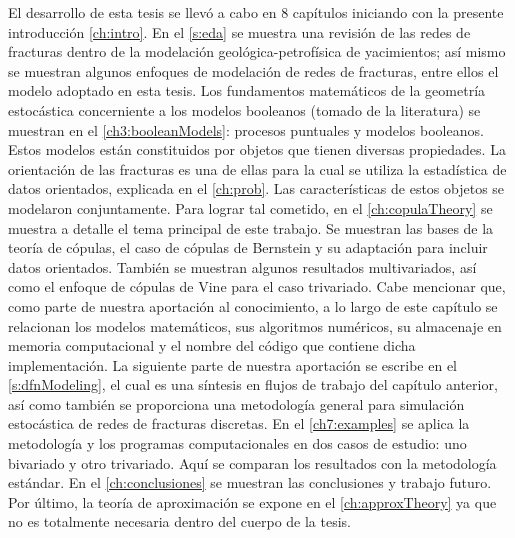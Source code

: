 El desarrollo de esta tesis se llev\'o a cabo en 8 cap\'itulos iniciando con la presente introducci\'on \autoref{ch:intro}.
En el \autoref{s:eda} se muestra una revisi\'on de las redes de fracturas dentro de la modelaci\'on geol\'ogica-petrof\'isica de yacimientos; as\'i mismo se muestran algunos enfoques de modelaci\'on de redes de fracturas, entre ellos el modelo adoptado en esta tesis.
Los fundamentos matem\'aticos de la geometr\'ia estoc\'astica concerniente a los modelos booleanos (tomado de la literatura) se muestran en el \autoref{ch3:booleanModels}: procesos puntuales y modelos booleanos.
Estos modelos est\'an constituidos por objetos que tienen diversas propiedades.
La orientaci\'on de las fracturas es una de ellas para la cual se utiliza la estad\'istica de datos orientados, explicada en el \autoref{ch:prob}. 
Las caracter\'isticas de estos objetos se modelaron conjuntamente.
Para lograr tal cometido, en el \autoref{ch:copulaTheory} se muestra a detalle el tema principal de este trabajo. Se muestran las bases de la teor\'ia de c\'opulas, el caso de c\'opulas de Bernstein y su adaptaci\'on para incluir datos orientados.
Tambi\'en se muestran algunos resultados multivariados, as\'i como el enfoque de c\'opulas de Vine para el caso trivariado.
Cabe mencionar que, como parte de nuestra aportaci\'on al conocimiento, a lo largo de este cap\'itulo se relacionan los modelos matem\'aticos, sus algoritmos num\'ericos, su almacenaje en memoria computacional y el nombre del c\'odigo que contiene dicha implementaci\'on.
La siguiente parte de nuestra aportaci\'on se escribe en el \autoref{s:dfnModeling}, el cual es una s\'intesis en flujos de trabajo del cap\'itulo anterior, as\'i como tambi\'en se proporciona una metodolog\'ia general para simulaci\'on estoc\'astica de redes de fracturas discretas.
En el \autoref{ch7:examples} se aplica la metodolog\'ia y los programas computacionales en dos casos de estudio: uno bivariado y otro trivariado. Aqu\'i se comparan los resultados con la metodolog\'ia est\'andar.
En el \autoref{ch:conclusiones} se muestran las conclusiones y trabajo futuro. 
Por \'ultimo, la teor\'ia de aproximaci\'on se expone en el \autoref{ch:approxTheory} ya que no es totalmente necesaria dentro del cuerpo de la tesis.



